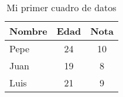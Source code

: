 \begin{table}[!ht]
\begin{center}
\begin{tabular}{|l|c|c|}
\hline
Nombre & Edad & Nota \\ \hline
Pepe   &   24 &   10 \\ \hline
Juan   &   19 &    8 \\ \hline
Luis   &   21 &    9 \\ \hline
\end{tabular}
\end{center}
\caption{Mi primer cuadro de datos}
\label{tab}
\end{table}

